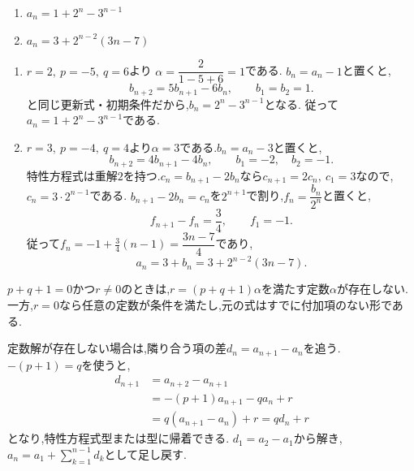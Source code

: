 \noindent{}\par\nobreak
\begin{enumerate}[label=(\arabic*),parsep=3pt,format=\bookitemlink{example-three-term-2}{answer}{problem}]
  \item $\displaystyle a_n=1+2^n-3^{n-1}$
  \item $\displaystyle a_n=3+2^{n-2}(3n-7)$
\end{enumerate}

\noindent{}\par\nobreak
\begin{enumerate}[label=(\arabic*),parsep=3pt,format=\bookitemlink{example-three-term-2}{solution}{problem}]
  \item $r=2,\ p=-5,\ q=6$より\BookMathLayout{}{\\}%
    $\alpha=\dfrac{2}{1-5+6}=1$である.
    $b_n=a_n-1$と置くと,
    \[
      b_{n+2}=5b_{n+1}-6b_n,\qquad b_1=b_2=1.
    \]
    と同じ更新式・初期条件だから,$b_n=2^n-3^{n-1}$となる.
    従って$a_n=1+2^n-3^{n-1}$である.
  \item $r=3,\ p=-4,\ q=4$より$\alpha=3$である.$b_n=a_n-3$と置くと,
    \[
      b_{n+2}=4b_{n+1}-4b_n,\qquad b_1=-2,\quad b_2=-1.
    \]
    特性方程式は重解$2$を持つ.$c_n=b_{n+1}-2b_n$なら$c_{n+1}=2c_n,\ c_1=3$なので,$c_n=3\cdot2^{n-1}$である.
    $b_{n+1}-2b_n=c_n$を$2^{n+1}$で割り,$f_n=\dfrac{b_n}{2^n}$と置くと,
    \[
      f_{n+1}-f_n=\frac34,\qquad f_1=-1.
    \]
    従って$f_n=-1+\frac34(n-1)=\dfrac{3n-7}{4}$であり,
    \[
      a_n=3+b_n=3+2^{n-2}(3n-7).
    \]
\end{enumerate}


$p+q+1=0$かつ$r\ne0$のときは,$r=(p+q+1)\alpha$を満たす定数$\alpha$が存在しない.
一方,$r=0$なら任意の定数が条件を満たし,元の式はすでに付加項のない形である.

定数解が存在しない場合は,隣り合う項の差$d_n=a_{n+1}-a_n$を追う.
$-(p+1)=q$を使うと,
\[
  \begin{aligned}
    d_{n+1}&=a_{n+2}-a_{n+1}\\
    &=-(p+1)a_{n+1}-qa_n+r\\
    &=q(a_{n+1}-a_n)+r=qd_n+r
  \end{aligned}
\]
となり,特性方程式型または型に帰着できる.
$d_1=a_2-a_1$から解き,$a_n=a_1+\sum_{k=1}^{n-1}d_k$として足し戻す.
